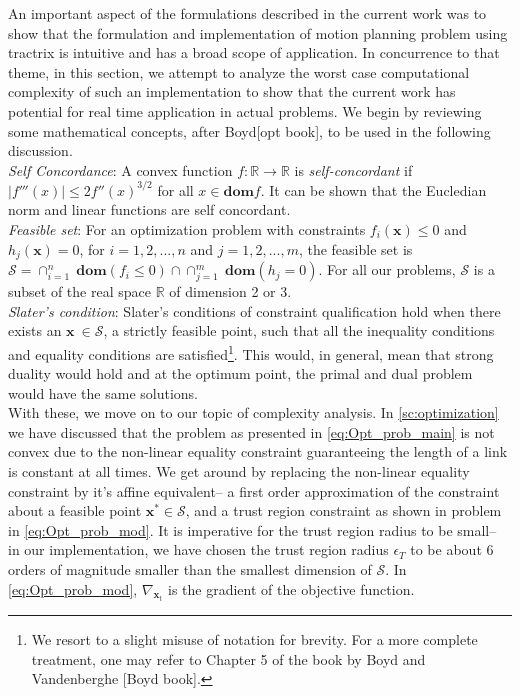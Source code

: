 \documentclass[12pt,a4]{article}
\begin{document}
An important aspect of the formulations described in the current work was to show that the formulation and implementation of motion planning problem using tractrix is intuitive and has a broad scope of application. In concurrence to that theme, in this section, we attempt to analyze the worst case computational complexity of such an implementation to show that the current work has potential for real time application in actual problems. We begin by reviewing some mathematical concepts, after Boyd[opt book], to be used in the following discussion.\\
\indent \textit{Self Concordance}: A convex function $f: \mathbb{R} \to \mathbb{R}$ is \textit{self-concordant} if $|f'''(x)|\leq 2f''(x)^{3/2}$ for all $x \in \textbf{dom}f$. It can be shown that the Eucledian norm and linear functions are self concordant.\\
\indent \textit{Feasible set}: For an optimization problem with constraints $f_i(\textbf{x})\leq 0$ and $h_j(\textbf{x})=0$, for $i=1,2,...,n$ and $j=1,2,...,m$, the feasible set is $\mathcal{S}=\cap_{i=1}^n~\textbf{dom}(f_i\leq0)\cap\cap_{j=1}^m~\textbf{dom}(h_j=0)$. For all our problems, $\mathcal{S} $ is a subset of the real space $\mathbb{R}$ of dimension 2 or 3.\\
\indent \textit{Slater's condition}: Slater's conditions of constraint qualification hold when there exists an $\textbf{x}~ \in \mathcal{S}$, a strictly feasible point,  such that all the inequality conditions and equality conditions are satisfied\footnote{We resort to a slight misuse of notation for brevity. For a more complete treatment, one may refer to Chapter 5 of the book by Boyd and Vandenberghe [Boyd book].}. This would, in general, mean that strong duality would hold and at the optimum point, the primal and dual problem would have the same solutions.\\
With these, we move on to our topic of complexity analysis. In \cref{sc:optimization} we have discussed that the problem as presented in \cref{eq:Opt_prob_main} is not  convex due to the non-linear equality constraint guaranteeing the length of a link is constant at all times. We get around by replacing the non-linear equality constraint by it's affine equivalent-- a first order approximation of the constraint about a feasible point $\textbf{x}^* \in \mathcal{S}$, and a trust region constraint as shown in problem in \cref{eq:Opt_prob_mod}. It is imperative for the trust region radius to be small-- in our implementation, we have chosen the trust region radius $\epsilon_T$ to be about 6 orders of magnitude smaller than the smallest dimension of $\mathcal{S}$. In \cref{eq:Opt_prob_mod}, $\nabla_{\textbf{x}_t}$ is the gradient of the objective function. 
\end{document}
